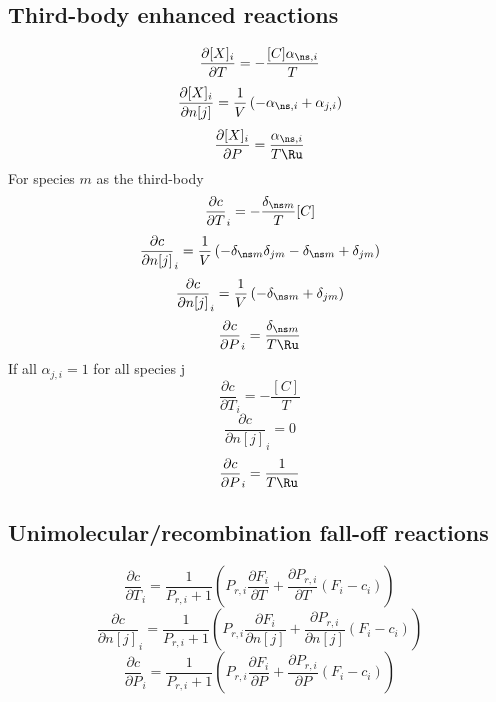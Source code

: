 \documentclass[a4paper,10pt]{article}
\begin{document}
\subsection{Third-body enhanced reactions}
\begin{dmath} \frac{\partial [X]_i }{\partial T } = - \frac{[C] \alpha_{\ns,i}}{T}\end{dmath} 
\begin{dmath} \frac{\partial [X]_i }{\partial n[j] } = \frac{1}{V} \left(- \alpha_{\ns,i} + \alpha_{j,i}\right)\end{dmath} 
\begin{dmath} \frac{\partial [X]_i }{\partial P } = \frac{\alpha_{\ns,i}}{T \Ru}\end{dmath} 
For species $m$ as the third-body
\begin{dmath} \frac{\partial c }{\partial T }_{i} = - \frac{\delta_{\ns m}}{T} [C]\end{dmath} 
\begin{dmath} \frac{\partial c }{\partial n[j] }_{i} = \frac{1}{V} \left(- \delta_{\ns m} \delta_{j m} - \delta_{\ns m} + \delta_{j m}\right)\end{dmath} 
\begin{dmath} \frac{\partial c }{\partial n[j] }_{i} = \frac{1}{V} \left(- \delta_{\ns m} + \delta_{j m}\right)\end{dmath} 
\begin{dmath} \frac{\partial c }{\partial P }_{i} = \frac{\delta_{\ns m}}{T \Ru}\end{dmath} 
If all $\alpha_{j, i} = 1$ for all species j
\begin{dmath} \frac{\partial c }{\partial T }_{i} = - \frac{[C]}{T}\end{dmath} 
\begin{dmath} \frac{\partial c }{\partial n[j] }_{i} = 0\end{dmath} 
\begin{dmath} \frac{\partial c }{\partial P }_{i} = \frac{1}{T \Ru}\end{dmath} 
\subsection{Unimolecular/recombination fall-off reactions}
\begin{dmath} \frac{\partial c }{\partial T }_{i} = \frac{1}{P_{r, i} + 1} \left(P_{r, i} \frac{\partial F_{i} }{\partial T } + \frac{\partial P_{r, i} }{\partial T } \left(F_{i} - c_{i}\right)\right)\end{dmath} 
\begin{dmath} \frac{\partial c }{\partial n[j] }_{i} = \frac{1}{P_{r, i} + 1} \left(P_{r, i} \frac{\partial F_{i} }{\partial n[j] } + \frac{\partial P_{r, i} }{\partial n[j] } \left(F_{i} - c_{i}\right)\right)\end{dmath} 
\begin{dmath} \frac{\partial c }{\partial P }_{i} = \frac{1}{P_{r, i} + 1} \left(P_{r, i} \frac{\partial F_{i} }{\partial P } + \frac{\partial P_{r, i} }{\partial P } \left(F_{i} - c_{i}\right)\right)\end{dmath} 
\end{document}
